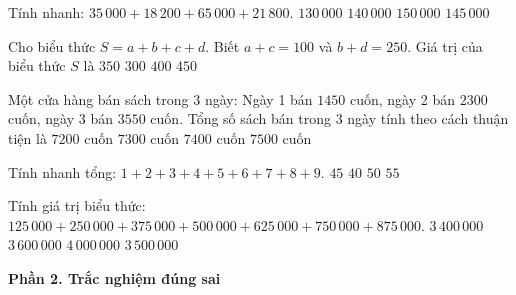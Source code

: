 \begin{ex} %
Tính nhanh: $35\,000 + 18\,200 + 65\,000 + 21\,800$.
\choice
{$130\,000$}
{\True $140\,000$}
{$150\,000$}
{$145\,000$}
\end{ex}

\begin{ex} %
Cho biểu thức $S = a + b + c + d$. Biết $a + c = 100$ và $b + d = 250$. Giá trị của biểu thức $S$ là
\choice
{\True $350$}
{$300$}
{$400$}
{$450$}
\end{ex}

\begin{ex} %
Một cửa hàng bán sách trong 3 ngày: Ngày 1 bán $1450$ cuốn, ngày 2 bán $2300$ cuốn, ngày 3 bán $3550$ cuốn. Tổng số sách bán trong 3 ngày tính theo cách thuận tiện là
\choice
{$7200$ cuốn}
{\True $7300$ cuốn}
{$7400$ cuốn}
{$7500$ cuốn}
\end{ex}

\begin{ex} %
Tính nhanh tổng: $1 + 2 + 3 + 4 + 5 + 6 + 7 + 8 + 9$.
\choice
{\True $45$}
{$40$}
{$50$}
{$55$}
\end{ex}

\begin{ex} %
Tính giá trị biểu thức: $125\,000 + 250\,000 + 375\,000 + 500\,000 + 625\,000 + 750\,000 + 875\,000$.
\choice
{$3\,400\,000$}
{$3\,600\,000$}
{$4\,000\,000$}
{\True $3\,500\,000$}
\end{ex}

\textbf{Phần 2. Trắc nghiệm đúng sai}

